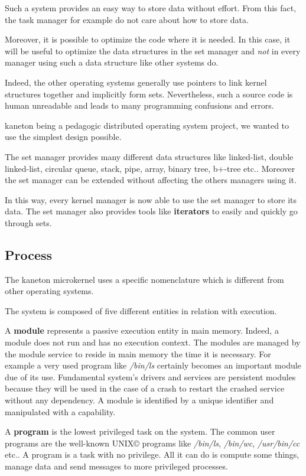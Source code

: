 \begin{multicols}{2}
Such a system provides an easy way to store data without effort. From this
fact, the task manager for example do not care about how to store data.

Moreover, it is possible to optimize the code where it is needed. In this
case, it will be useful to optimize the data structures in the set manager
and \textit{not} in every manager using such a data structure like
other systems do.

Indeed, the other operating systems generally use pointers to link kernel
structures together and implicitly form sets. Nevertheless, such a source code
is human unreadable and leads to many programming confusions and errors.

kaneton being a pedagogic distributed operating system project, we wanted
to use the simplest design possible.

The set manager provides many different data structures like linked-list,
double linked-list, circular queue, stack, pipe, array, binary tree, b+-tree
etc.. Moreover the set manager can be extended without affecting the others
managers using it.

In this way, every kernel manager is now able to use the set manager to
store its data. The set manager also provides tools like \textbf{iterators}
to easily and quickly go through sets.

\subsection{Process}

The kaneton microkernel uses a specific nomenclature which is different
from other operating systems.

The system is composed of five different entities in relation with execution.

A \textbf{module} represents a passive execution entity in main memory.
Indeed, a module does not run and has no execution context. The modules are
managed by the module service to reside in main memory the time it is
necessary. For example a very used program like \textit{/bin/ls} certainly
becomes an important module due of its use. Fundamental system's drivers
and services are persistent modules because they will be used in the case
of a crash to restart the crashed service without any dependency.
A module is identified by a unique identifier and manipulated with a
capability.

A \textbf{program} is the lowest privileged task on the system.
The common user programs are the well-known UNIX{\scriptsize \copyright}
programs like \textit{/bin/ls}, \textit{/bin/wc}, \textit{/usr/bin/cc} etc..
A program is a task with no privilege. All it can do is compute some things,
manage data and send messages to more privileged processes.


\end{multicols}
